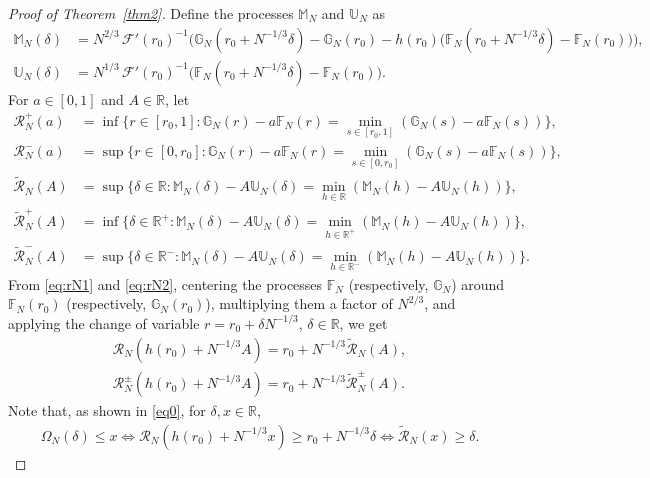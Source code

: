 \documentclass[12pt]{amsart}
\theoremstyle{plain}
\theoremstyle{remark}
\numberwithin{equation}{section}
\begin{document}
\begin{proof}[Proof of Theorem~\ref{thm2}]
Define the processes \(\mathbb{M}_{N}\) and $\mathbb{U}_{N}$ as
\begin{align*}
\mathbb{M}_{N}(\delta) &= N^{2/3} \, \mathcal{F}'(r_{0})^{-1} 
\Big( \mathbb{G}_{N}(r_{0} + N^{-1/3}\delta) - \mathbb{G}_{N}(r_{0}) 
- h(r_0) \big( \mathbb{F}_N(r_{0} + N^{-1/3}\delta) - \mathbb{F}_N(r_{0}) \big) \Big), \\
\mathbb{U}_{N}(\delta) &= N^{1/3} \, \mathcal{F}'(r_{0})^{-1} 
\big( \mathbb{F}_N(r_{0} + N^{-1/3}\delta) - \mathbb{F}_N(r_{0}) \big).
\end{align*}
For $a \in [0,1]$ and $A \in \mathbb{R}$, let 
\begin{align*}
   \mathcal{R}^{+}_N(a) &= \inf\{r \in \left[r_0, 1\right] : \mathbb{G}_{N}(r)-a \mathbb{F}_{N}(r) = \min_{s \in \left[r_0, 1\right]} (\mathbb{G}_{N}(s)-a \mathbb{F}_{N}(s))\},\\
   \mathcal{R}^{-}_N(a) &= \sup\{r \in \left[0, r_0\right] : \mathbb{G}_{N}(r)-a \mathbb{F}_{N}(r) = \min_{s \in \left[0, r_0\right]} (\mathbb{G}_{N}(s)-a \mathbb{F}_{N}(s))\},\\
   \widetilde{\mathcal{R}}_N(A) &= \sup\{\delta \in \mathbb{R} : \mathbb{M}_{N}(\delta)-A\mathbb{U}_{N}(\delta) = \min_{h \in \mathbb{R}} (\mathbb{M}_{N}(h)-A \mathbb{U}_{N}(h))\},
   \\ \widetilde{\mathcal{R}}^{+}_N(A) &= \inf\{\delta \in \mathbb{R}^{+} : \mathbb{M}_{N}(\delta)-A\mathbb{U}_{N}(\delta) = \min_{h \in \mathbb{R}^{+}} (\mathbb{M}_{N}(h)-A \mathbb{U}_{N}(h))\},
   \\ \widetilde{\mathcal{R}}^{-}_N(A) &= \sup\{\delta \in \mathbb{R}^{-} : \mathbb{M}_{N}(\delta)-A\mathbb{U}_{N}(\delta) = \min_{h \in \mathbb{R}^{-}} (\mathbb{M}_{N}(h)-A \mathbb{U}_{N}(h))\}.
\end{align*}
From \eqref{eq:rN1} and \eqref{eq:rN2}, centering the
processes $\mathbb{F}_N$ (respectively, $\mathbb{G}_N$) around $\mathbb{F}_N(r_0)$ (respectively, $\mathbb{G}_N(r_0)$), multiplying them a factor of $N^{2/3}$, and applying the change of variable $r = r_0 + \delta N^{-1/3}$, $\delta \in \mathbb{R}$, we get
\begin{align*}
\mathcal{R}_N(h(r_0) + N^{-1/3} A) = r_0 + N^{-1/3}\widetilde{\mathcal{R}}_N(A), \\
\mathcal{R}^{\pm}_N(h(r_0) + N^{-1/3} A) = r_0 + N^{-1/3}\widetilde{\mathcal{R}}^{\pm}_N(A).
\end{align*}
Note that, as shown in \eqref{eq0}, for $\delta, x \in \mathbb{R}$, 
\begin{align}\label{eq:rN4}
    \Omega_{N}(\delta) \leq x \iff \mathcal{R}_N\left(h(r_0) + N^{-1/3}x\right) \geq r_0 + N^{-1/3}\delta \iff \widetilde{\mathcal{R}}_N(x)\geq \delta.

\end{align}
\end{proof}
\end{document}
